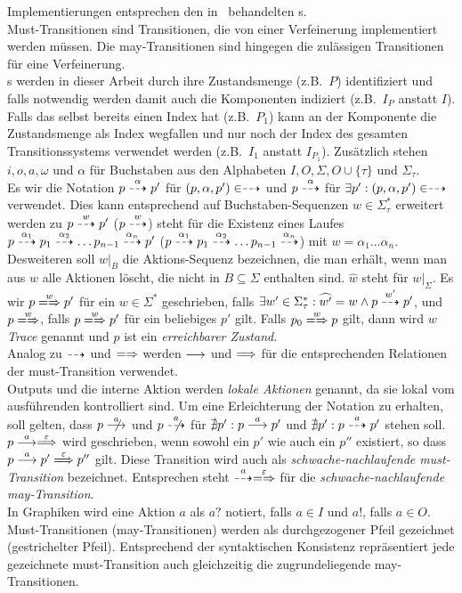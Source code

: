 Implementierungen entsprechen den in~\cite{Schinko2016BA} behandelten
\EIO{}s.\\
Must-Transitionen sind Transitionen, die von einer Verfeinerung implementiert
werden müssen. Die may-Transitionen sind hingegen die zulässigen Transitionen
für eine Verfeinerung.\\
\MEIO{}s  werden in dieser Arbeit durch ihre Zustandsmenge (z.B.\ $P$)
identifiziert und falls notwendig werden damit auch die Komponenten indiziert
(z.B.\ $I_P$ anstatt $I$). Falls das \MEIO{} selbst bereits einen Index hat
(z.B.\ $P_1$) kann an der Komponente die Zustandsmenge als Index wegfallen und
nur noch der Index des gesamten Transitionssystems verwendet werden (z.B.\ $I_1$ anstatt
$I_{P_1}$). Zusätzlich stehen $i,o,a,\omega$ und $\alpha$ für Buchstaben aus
den Alphabeten $I,O,\Sigma ,O\cup\{\tau\}$ und $\Sigma_\tau$.\\
Es wir die Notation $p\may[\alpha] p'$ für $(p,\alpha,p')\in\may$ und
$p\may[\alpha]$ für $\exists p':(p,\alpha,p')\in\may$ verwendet. Dies kann
entsprechend auf Buchstaben-Sequenzen $w\in\Sigma_{\tau}^*$ erweitert werden zu
$p\may[w]p'$ ($p\may[w]$) steht für die Existenz eines Laufes $p\may[\alpha _1]
p_1\may[\alpha _2]\dots p_{n-1}\may[\alpha _n] p'$ ($p\may[\alpha _1]
p_1\may[\alpha _2]\dots p_{n-1}\may[\alpha _n]$) mit $w=\alpha _1\dots \alpha
_n$.\\
Desweiteren soll $w|_B$ die Aktions-Sequenz bezeichnen, die man erhält, wenn
man aus $w$ alle Aktionen löscht, die nicht in $B\subseteq\Sigma$ enthalten
sind. $\widehat{w}$ steht für $w|_{\Sigma}$. Es wir $p\weakmay[w] p'$
für ein $w\in\Sigma ^*$ geschrieben, falls $\exists
w'\in\Sigma_{\tau}^*:\widehat{w'}=w\land p\may[w']p'$, und $p\weakmay[w]$,
falls $p\weakmay[w] p'$ für ein beliebiges $p'$ gilt. Falls $p_0\weakmay[w] p$
gilt, dann wird $w$ \emph{Trace} genannt und $p$ ist ein \emph{erreichbarer
Zustand}.\\
Analog zu $\may$ und $\weakmay$ werden $\must$ und $\weakmust$ für die
entsprechenden Relationen der must-Transition verwendet.\\
Outputs und die interne Aktion werden \emph{lokale Aktionen} genannt, da sie
lokal vom ausführenden \MEIO{} kontrolliert sind. Um eine Erleichterung der
Notation zu erhalten, soll gelten, dass $p\nmust[a]$ und $p\nmay[a]$ für
$\nexists p': p\must[a]p'$ und $\nexists p': p\may[a]p'$ stehen soll.
$p\must[a]\weakmust[\varepsilon]$ wird geschrieben, wenn sowohl ein $p'$ wie
auch ein $p''$ existiert, so dass $p\must[a]p'\weakmust[\varepsilon]p''$ gilt.
Diese Transition wird auch als \emph{schwache-nachlaufende must-Transition}
bezeichnet. Entsprechen steht $\may[a]\weakmay[\varepsilon]$ für die
\emph{schwache-nachlaufende may-Transition}.\\
In Graphiken wird eine Aktion $a$ als $a?$ notiert, falls $a\in I$ und $a!$,
falls $a\in O$. Must-Transitionen (may-Transitionen) werden als durchgezogener
Pfeil gezeichnet (gestrichelter Pfeil). Entsprechend der syntaktischen
Konsistenz repräsentiert jede gezeichnete must-Transition auch gleichzeitig die
zugrundeliegende may-Transitionen.

